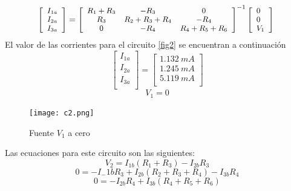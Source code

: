 \documentclass[twocolumn]{IEEEtran}
\begin{document}
\begin{equation}
\footnotesize
 \left[ \begin{array}{l}
 {I_{1a}} \\ 
 {I_{2a}} \\ 
 {I_{3a}} \\ 
 \end{array} \right] = {\left[ {\begin{array}{*{20}{c}}
   {{R_1} + {R_3}} & { - {R_3}} & 0  \\
   {{R_3}} & {{R_2} + {R_3} + {R_4}} & { - {R_4}}  \\
   0 & { - {R_4}} & {{R_4} + {R_5} + {R_6}}  \\
\end{array}} \right]^{ - 1}}\left[ \begin{array}{l}
 0 \\ 
 0 \\ 
 {V_1} \\ 
 \end{array} \right]\
\label{mat1}
\end{equation}
\noindent
El valor de las corrientes para el circuito \ref{fig2} se encuentran a continuación
\begin{equation}
 \left[ \begin{array}{l}
 {I_{1a}} \\ 
 {I_{2a}} \\ 
 {I_{3a}} \\ 
 \end{array} \right] = \left[ \begin{array}{l}
 1.132 \ mA\\ 
 1.245 \ mA\\ 
 5.119 \ mA\\ 
 \end{array} \right]
\end{equation}
$$V_1 = 0$$
\begin{figure}[H]
	\centering
		\texttt{[image: c2.png]}
	\caption{Fuente $V_1$ a cero}
	\label{fig3}
\end{figure}
\noindent
Las ecuaciones para este circuito son las siguientes:
\begin{equation}
 {V_2} = {I_{1b}}\left( {{R_1} + {R_3}} \right) - {I_{2b}}{R_3}
\end{equation}
\begin{equation}
 0 =  - {I_-{1b}}{R_3} + {I_{2b}}\left( {{R_2} + {R_3} + {R_4}} \right) - {I_{3b}}{R_4}
\end{equation}
\begin{equation}
 0 =  - {I_{2b}}{R_4} + {I_{3b}}\left( {{R_4} + {R_5} + {R_6}} \right)
\end{equation}
\end{document}
